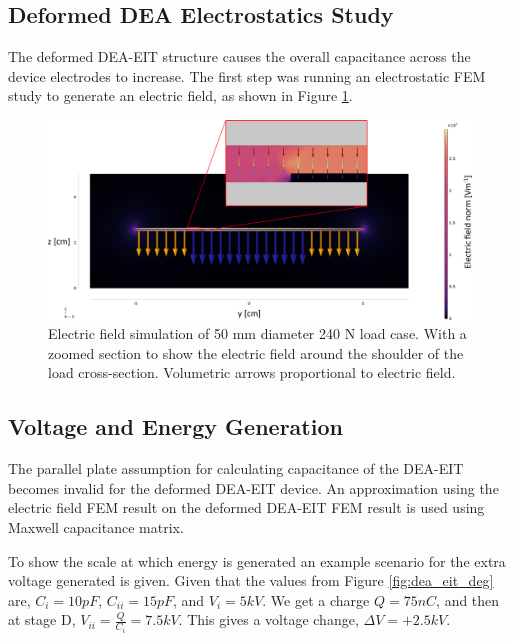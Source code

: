 \subsection{Deformed DEA Electrostatics Study}
The deformed DEA-EIT structure causes the overall capacitance across the device electrodes to increase. The first step was running an electrostatic FEM study to generate an electric field, as shown in Figure \ref{fig:FEM_DEA-EIT_cap}.
\begin{figure}[H]
	\centering
	\includegraphics[width=\linewidth]{Figures/d50mm_load_labelled_shoulder_zoom.png}
	\caption{Electric field simulation of 50 mm diameter 240 N load case. With a zoomed section to show the electric field around the shoulder of the load cross-section. Volumetric arrows proportional to electric field.}
	\label{fig:FEM_DEA-EIT_cap}
\end{figure}


\subsection{Voltage and Energy Generation}
\label{subsec:Voltage and Energy Generation}
The parallel plate assumption for calculating capacitance of the DEA-EIT becomes invalid for the deformed DEA-EIT device. An approximation using the electric field FEM result on the deformed DEA-EIT FEM result is used using Maxwell capacitance matrix.

To show the scale at which energy is generated an example scenario for the extra voltage generated is given. Given that the values from Figure \ref{fig:dea_eit_deg} are, $C_i = 10 pF$, $C_{ii} = 15 pF$, and $V_i = 5 kV$. We get a charge $Q = 75 nC$, and then at stage D, $V_{ii} = \frac{Q}{C_{i}} = 7.5 kV$. This gives a voltage change, $\Delta V = +2.5 kV$. 

